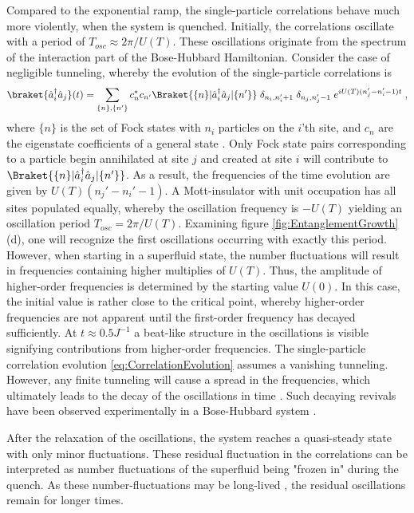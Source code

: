 Compared to the exponential ramp, the single-particle correlations behave much more violently, when the system is quenched. Initially, the correlations oscillate with a period of $T_{osc} \approx 2 \pi / U(T)$. These oscillations originate from the spectrum of the interaction part of the Bose-Hubbard Hamiltonian. Consider the case of negligible tunneling, whereby the evolution of the single-particle correlations is
\begin{equation}
	\braket{\hat{a}_{i}^{\dag} \hat{a}_{j}}(t) = \sum_{ \{ n \} , \{ n' \}} c_{n}^{*} c_{n'} \Braket{ \{ n \} | \hat{a}_{i}^{\dag} \hat{a}_{j} | \{ n' \}} \; \delta_{n_i , n_{i}' +1} \; \delta_{n_j , n_{j}' -1} \; e^{i U(T) (n_j ' - n_i ' - 1) t} \; ,
	\label{eq:CorrelationEvolution}
\end{equation}
where $\{ n \}$ is the set of Fock states with $n_i$ particles on the $i$'th site, and $c_n$ are the eigenstate coefficients of a general state \cite{Lauchli2008}. Only Fock state pairs corresponding to a particle begin annihilated at site $j$ and created at site $i$ will contribute to $\Braket{ \{ n \} | \hat{a}_{i}^{\dag} \hat{a}_{j} | \{ n' \}}$. As a result, the frequencies of the time evolution are given by $U(T) (n_j ' - n_i ' - 1)$. A Mott-insulator with unit occupation has all sites populated equally, whereby the oscillation frequency is $-U(T)$ yielding an oscillation period $T_{osc} = 2 \pi / U(T)$. Examining figure \ref{fig:EntanglementGrowth}(d), one will recognize the first oscillations occurring with exactly this period. 
However, when starting in a superfluid state, the number fluctuations will result in frequencies containing higher multiplies of $U(T)$. Thus, the amplitude of higher-order frequencies is determined by the starting value $U(0)$.
In this case, the initial value is rather close to the critical point, whereby higher-order frequencies are not apparent until the first-order frequency has decayed sufficiently. At $t \approx 0.5 J^{-1}$ a beat-like structure in the oscillations is visible signifying contributions from higher-order frequencies. 
The single-particle correlation evolution \eqref{eq:CorrelationEvolution} assumes a vanishing tunneling. However, any finite tunneling will cause a spread in the frequencies, which ultimately leads to the decay of the oscillations in time \cite{Kollath2007}. Such decaying revivals have been observed experimentally in a Bose-Hubbard system \cite{Greiner2002collapse}.

After the relaxation of the oscillations, the system reaches a quasi-steady state with only minor fluctuations. These residual fluctuation in the correlations can be interpreted as number fluctuations of the superfluid being "frozen in" during the quench. As these number-fluctuations may be long-lived \cite{Schutzhold2006}, the residual oscillations remain for longer times. 

